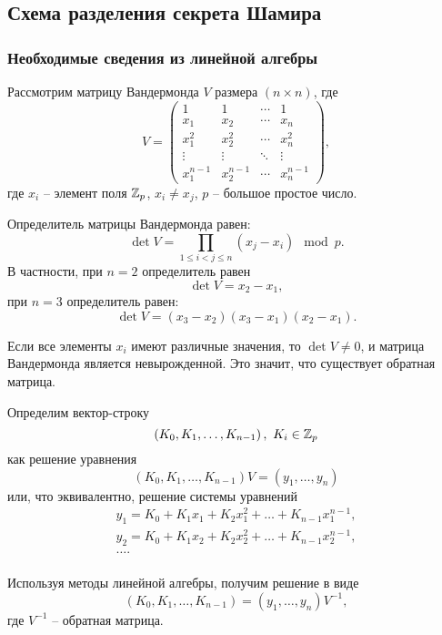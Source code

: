 \subsection[Схема Шамира]{Схема разделения секрета Шамира}


\subsubsection{Необходимые сведения из линейной алгебры}

Рассмотрим матрицу Вандермонда $V$ размера $(n \times n)$, где
\[
    V = \left(\begin{array}{cccc}
        {1} & {1} & { \cdots } & {1} \\
        { x_{1} } & { x_{2} } & { \cdots } & { x_{n} } \\
        { x_{1}^{2} } & { x_{2}^{2} } & { \cdots } & { x_{n}^{2}} \\
        { \vdots } & { \vdots } & { \ddots } & { \vdots } \\
        { x_{1}^{n-1} } & { x_{2}^{n-1} } & { \cdots } & { x_{n}^{n-1} }
    \end{array}\right),
\]
где $x_{i}$ -- элемент поля $\mathbb{Z}_{p}$, $x_{i} \ne x_{j}$, $p$ -- большое простое число.

Определитель матрицы Вандермонда равен:
    \[ \det V = \prod_{1\le i < j\le n} \left(x_j - x_i \right) \mod p. \]
В частности, при $n=2$ определитель равен
    \[ \det V = x_2 - x_1, \]
при $n=3$ определитель равен:
    \[ \det V = (x_3 - x_2) (x_3 - x_1) (x_2 - x_1). \]

Если все элементы $x_{i}$ имеют различные значения, то $\det V \ne 0$, и матрица Вандермонда является невырожденной. Это значит, что существует обратная матрица.

Определим вектор-строку
    \[ \left(K_{0}, K_{1}, \ldots, K_{n-1}\right), ~ K_{i} \in \mathbb{Z}_{p} \]
как решение уравнения
    \[ (K_{0} ,K_{1} , \ldots, K{}_{n-1} )V=(y_{1} , \ldots, y_{n} ) \]
или, что эквивалентно, решение системы уравнений
\[ \begin{array}{l}
    y_1 = K_0 + K_1 x_1 + K_2 x_1^2 + \dots + K_{n-1} x_1^{n-1}, \\
    y_2 = K_0 + K_1 x_2 + K_2 x_2^2 + \dots + K_{n-1} x_2^{n-1}, \\
    \dots.\\
\end{array} \]

Используя методы линейной алгебры, получим решение в виде
    \[ (K_{0} ,K_{1} , \ldots, K_{n-1} )=(y_{1} , \ldots, y_{n} )V^{-1}, \]
где $V^{-1}$ -- обратная матрица.

